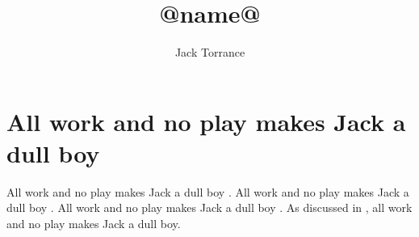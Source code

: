 \documentclass{article}
\title{@name@}
\author{Jack Torrance}
\begin{document}
\maketitle

\section{All work and no play makes Jack a dull boy}

All work and no play makes Jack a dull boy \citep{Griewank1989, RCoreTeam2014}.
All work and no play makes Jack a dull boy \citep{Brenguier2008, Veen2008}.
All work and no play makes Jack a dull boy \citep{Jack1980}.
As discussed in \citet{Boyd2004}, all work and no play makes Jack a dull boy.



\end{document}

